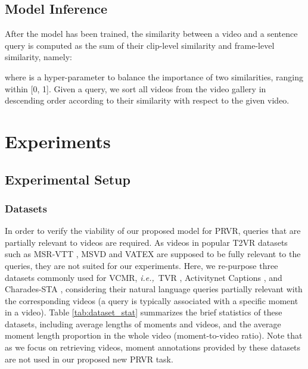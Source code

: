 \documentclass[sigconf]{acmart}
\newcommand{\ie}{\emph{i.e.,}~}
\begin{document}
\subsection{Model Inference}
After the model has been trained, the similarity between a video and a sentence query is computed as the sum of their clip-level similarity and frame-level similarity, namely:

where  is a hyper-parameter to balance the importance of two similarities, ranging within [0, 1].
Given a query, we sort all videos from the video gallery in descending order according to their similarity with respect to the given video.




\section{Experiments} \label{sec:eval}


\subsection{Experimental Setup} \label{ssec:exp-set}


\subsubsection{Datasets}
In order to verify the viability of our proposed model for PRVR, queries that are partially relevant to videos are required. As videos in popular T2VR datasets such as MSR-VTT \cite{xu2016msr}, MSVD \cite{chen2011collecting} and VATEX \cite{wang2019vatex} are supposed to be fully relevant to the queries, they are not suited for our experiments.
Here, we re-purpose three datasets commonly used for VCMR, \ie TVR \cite{lei2020tvr}, Activitynet Captions \cite{krishna2017dense}, and Charades-STA \cite{gao2017tall}, considering their natural language queries partially relevant with the corresponding videos (a query is typically associated with a specific moment in a video).
Table \ref{tab:dataset_stat} summarizes the brief statistics of these datasets, including average lengths of moments and videos, and the average moment length proportion in the whole video (moment-to-video ratio). Note that as we focus on retrieving videos, moment annotations provided by these datasets are not used in our proposed new PRVR task.
\end{document}
